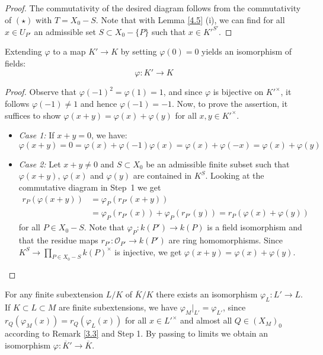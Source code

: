 \begin{proof}
The commutativity of the desired diagram follows from the commutativity of $(\star)$ with $T=X_0 -  S$. Note that with Lemma \ref{4.5} (i), we can find for all $x\in U_{P'}$ an admissible set $S\subset X_0 -  \{P\}$ such that $x\in K'^{S'}$.
\end{proof}

\begin{step}
Extending $\varphi$ to a map $K'\to K$ by setting $\varphi(0)=0$ yields an isomorphism of fields: 
\[\varphi:K'\to K\]
\end{step}

\begin{proof}
Observe that $\varphi(-1)^2 = \varphi(1) = 1$, and since $\varphi$ is bijective on $K'^\times$, it follows $\varphi(-1) \neq 1$ and hence $\varphi(-1) = -1$. Now, to prove the assertion, it suffices to show $\varphi(x + y) = \varphi(x) + \varphi(y)$ for all $x,y\in K'^\times$.
\begin{itemize}
\item \textit{Case 1:} If $x + y = 0$, we have:
\[ \varphi(x + y) = 0 = \varphi(x) + \varphi(-1)\varphi(x) = \varphi(x) + \varphi(-x) = \varphi(x) + \varphi(y) \]
\item \textit{Case 2:} Let $x + y\neq 0$ and $S\subset X_0$ be an admissible finite subset such that $\varphi(x + y)$, $\varphi(x)$ and $\varphi(y)$ are contained in $K^S$. Looking at the commutative diagram in \mbox{Step 1} we get
\begin{align*}
r_P(\varphi(x+ y)) &= \varphi_P(r_{P'}(x + y)) \\
&= \varphi_P(r_{P'}(x)) + \varphi_P(r_{P'}(y)) = r_P(\varphi(x) + \varphi(y))
\end{align*}
for all $P\in X_0 -  S$. Note that $\varphi_P: k(P')\to k(P)$ is a field isomorphism and that the residue maps $r_{P'}: \mathcal{O}_{P'} \to k(P')$ are ring homomorphisms. Since $K^S\to \prod_{P\in X_0 -  S} k(P)^\times$ is injective, we get $\varphi(x+y) = \varphi(x) + \varphi(y)$.\qedhere
\end{itemize}
\end{proof}

\begin{remark}
For any finite subextension $L/K$ of $\overline{K}/K$ there exists an isomorphism $\varphi_L: L'\to L$. If $K\subset L\subset M$ are finite subextensions, we have $\varphi_M|_{L'} = \varphi_{L'}$, since $r_Q(\varphi_M(x)) = r_Q(\varphi_L(x))$ for all $x\in L'^\times$ and almost all $Q\in (X_M)_0$ according to Remark \ref{3.3} and Step 1. By passing to limits we obtain an isomorphism $\varphi: \overline{K}'\to \overline{K}$.
\end{remark}

